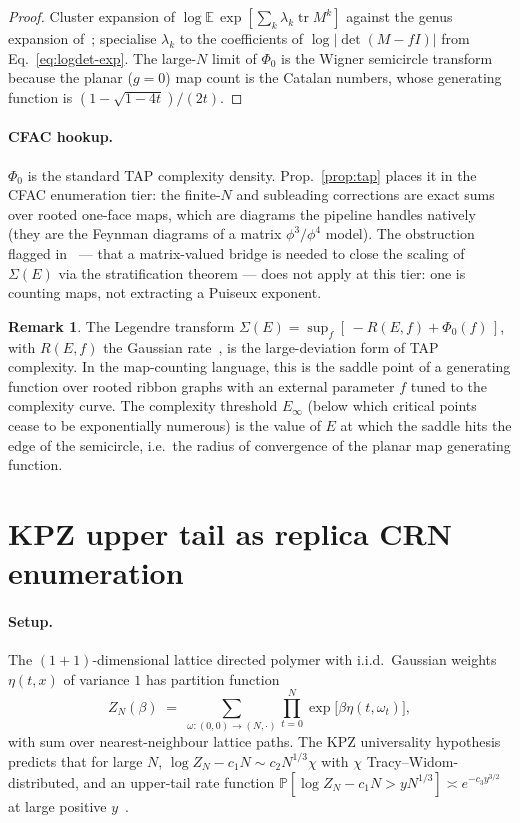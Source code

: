 \documentclass[10pt,a4paper,twocolumn]{article}
\theoremstyle{plain}
\theoremstyle{definition}
\newtheorem{remark}{Remark}
\newcommand{\Tr}{\operatorname{tr}}
\newcommand{\Ex}{\mathbb{E}}
\begin{document}
\begin{proof}
Cluster expansion of $\log \Ex\,\exp[\sum_k \lambda_k \Tr M^k]$ against
the genus expansion of~\citep{HarerZagier1986, GouldenJackson1997};
specialise $\lambda_k$ to the coefficients of $\log|\det(M - fI)|$
from Eq.~\eqref{eq:logdet-exp}.  The large-$N$ limit of
$\Phi_0$ is the Wigner semicircle transform because the
planar ($g = 0$) map count is the Catalan numbers, whose generating
function is $(1 - \sqrt{1 - 4t})/(2t)$.
\end{proof}

\paragraph{CFAC hookup.}  $\Phi_0$ is the standard TAP complexity
density.  Prop.~\ref{prop:tap} places it in the CFAC enumeration
tier: the finite-$N$ and subleading corrections are exact sums over
rooted one-face maps, which are diagrams the pipeline handles
natively (they are the Feynman diagrams of a matrix $\phi^3 / \phi^4$
model).  The obstruction flagged
in~\citep[\S7.2]{AmarteifioMannaC3} --- that a matrix-valued bridge
is needed to close the scaling of $\Sigma(E)$ via the stratification
theorem --- does not apply at this tier: one is counting maps, not
extracting a Puiseux exponent.

\begin{remark}
The Legendre transform
$\Sigma(E) = \sup_f [\,-R(E, f) + \Phi_0(f)\,]$, with $R(E, f)$
the Gaussian rate~\citep{ABAC2013}, is the large-deviation form of
TAP complexity.  In the map-counting language, this is the saddle
point of a generating function over rooted ribbon graphs with an
external parameter $f$ tuned to the complexity curve.  The complexity
threshold $E_\infty$ (below which critical points cease to be
exponentially numerous) is the value of $E$ at which the saddle hits
the edge of the semicircle, i.e.\ the radius of convergence of the
planar map generating function.
\end{remark}

\section{KPZ upper tail as replica CRN enumeration}
\label{sec:kpz}

\paragraph{Setup.}  The $(1{+}1)$-dimensional lattice directed
polymer with i.i.d.\ Gaussian weights $\eta(t, x)$ of variance $1$ has
partition function
\begin{equation}
  Z_N(\beta) \;=\; \sum_{\omega : (0,0) \to (N, \cdot)}
    \prod_{t=0}^{N} \exp\!\bigl[\beta \eta(t, \omega_t)\bigr],
\end{equation}
with sum over nearest-neighbour lattice paths.  The KPZ universality
hypothesis predicts that for large $N$, $\log Z_N - c_1 N \sim c_2
N^{1/3} \chi$ with $\chi$ Tracy--Widom-distributed, and an upper-tail
rate function
$\mathbb{P}[\log Z_N - c_1 N > y N^{1/3}] \asymp e^{-c_3 y^{3/2}}$
at large positive $y$~\citep{CorwinGhosal2020, Krajenbrink}.
\end{document}
